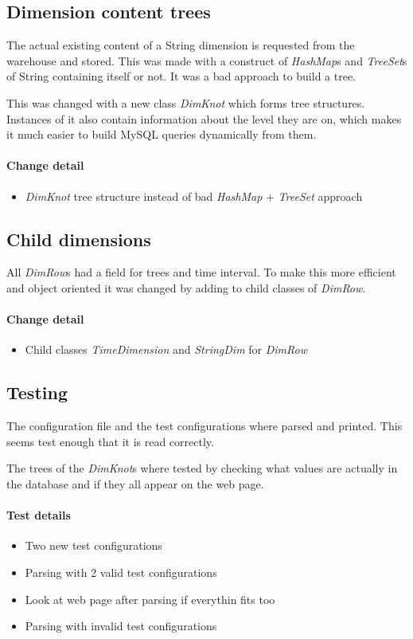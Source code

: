 \subsection{Dimension content trees}
The actual existing content of a String dimension is requested from
the warehouse and stored. This was made with a construct
of \textit{HashMap}s and \textit{TreeSet}s of String containing itself or not. It was
a bad approach to build a tree.

This was changed with a new class \textit{DimKnot} which forms tree structures. 
Instances of it also contain information about the level they are on,
which makes it much easier to build MySQL queries dynamically from them.
\paragraph{Change detail}
\begin{itemize}
  \item \textit{DimKnot} tree structure instead of bad \textit{HashMap} + \textit{TreeSet} approach
\end{itemize}



\subsection{Child dimensions}
All \textit{DimRow}s had a field for trees and time interval. To make this more
efficient and object oriented it was changed
by adding to child classes of \textit{DimRow}.
\paragraph{Change detail}
\begin{itemize}
  \item Child classes \textit{TimeDimension} and \textit{StringDim} for \textit{DimRow}
\end{itemize}

\subsection{Testing}

The configuration file and the test configurations where parsed and printed. 
This seems test enough that it is read correctly. 

The trees of the \textit{DimKnot}s where tested by checking what values are actually in the
database and if they all appear on the web page.

\paragraph{Test details}
\begin{itemize}
  \item Two new test configurations
  \item Parsing with 2 valid test configurations
  \item Look at web page after parsing if everythin fits too
  \item Parsing with invalid test configurations
\end{itemize}


